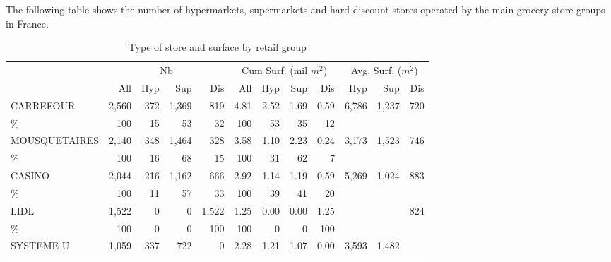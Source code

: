 \documentclass[11pt]{article}
\begin{document}
The following table shows the number of hypermarkets, supermarkets and hard discount stores operated by the main grocery store groups in France.

\begin{table}[H]
\caption{Type of store and surface by retail group}
\footnotesize
\setlength{\tabcolsep}{2pt}

\begin{tabular}{l|rrrr|rrrr|rrr}
\toprule
{}             & \multicolumn{4}{c|}{Nb} &   \multicolumn{4}{c|}{Cum Surf. (mil $m^2$)}   &   \multicolumn{3}{c}{Avg. Surf. ($m^2$)}\\
{}             &        All &  Hyp       &        Sup &       Dis  &      All   & Hyp        &        Sup &        Dis &      Hyp   &       Sup  &    Dis \\
\midrule
CARREFOUR      &      2,560 &        372 &      1,369 &        819 &       4.81 &       2.52 &       1.69 &       0.59 &      6,786 &      1,237 &        720 \\
\%             &        100 &         15 &         53 &         32 &        100 &         53 &         35 &         12 &            &            &            \\
MOUSQUETAIRES  &      2,140 &        348 &      1,464 &        328 &       3.58 &       1.10 &       2.23 &       0.24 &      3,173 &      1,523 &        746 \\
\%             &        100 &         16 &         68 &         15 &        100 &         31 &         62 &          7 &            &            &            \\
CASINO         &      2,044 &        216 &      1,162 &        666 &       2.92 &       1.14 &       1.19 &       0.59 &      5,269 &      1,024 &        883 \\
\%             &        100 &         11 &         57 &         33 &        100 &         39 &         41 &         20 &            &            &            \\
LIDL           &      1,522 &          0 &          0 &      1,522 &       1.25 &       0.00 &       0.00 &       1.25 &            &            &        824 \\
\%             &        100 &          0 &          0 &        100 &        100 &          0 &          0 &        100 &            &            &            \\
SYSTEME U      &      1,059 &        337 &        722 &          0 &       2.28 &       1.21 &       1.07 &       0.00 &      3,593 &      1,482 &            \\

\end{tabular}
\end{table}
\end{document}
